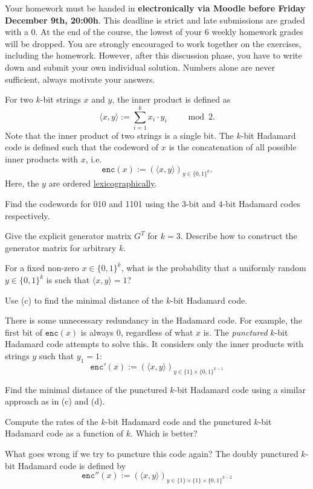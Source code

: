 \documentclass[a4paper,10pt,landscape,twocolumn]{scrartcl}
\newcommand\deadline{Friday December 9th, 20:00h}
\begin{document}
\homeworkproblems

{\sffamily\noindent
Your homework must be handed in \textbf{electronically via Moodle before \deadline}. This deadline is strict and late submissions are graded with a 0. At the end of the course, the lowest of your 6 weekly homework grades will be dropped. You are strongly encouraged to work together on the exercises, including the homework. However, after this discussion phase, you have to write down and submit your own individual solution. Numbers alone are never sufficient, always motivate your answers.
}

\newcommand{\ip}[2]{\langle #1, #2\rangle}
\begin{exercise}
For two $k$-bit strings $x$ and $y$, the inner product is defined as
\[
\ip{x}{y} := \sum_{i=1}^k x_i\cdot y_i \ \ \ \ \ \ \ \ \mod 2.
\]
Note that the inner product of two strings is a single bit. The $k$-bit Hadamard code is defined such that the codeword of $x$ is the concatenation of all possible inner products with $x$, i.e.
\[
\mathtt{enc}(x) := \left(\ip{x}{y}\right)_{y \in \{0,1\}^k}.
\]
Here, the $y$ are ordered \href{https://en.wikipedia.org/wiki/Lexicographical_order}{lexicographically}.
	\begin{subex}[(1pt)]
	Find the codewords for 010 and 1101 using the 3-bit and 4-bit Hadamard codes respectively.
	\end{subex}
	\begin{subex}[(2pt)]
	Give the explicit generator matrix $G^T$ for $k = 3$. Describe how to construct the generator matrix for arbitrary $k$.
	\end{subex}
	\begin{subex}[(2pt)]
	For a fixed non-zero $x \in \{0,1\}^k$, what is the probability that a uniformly random $y \in \{0,1\}^k$ is such that $\ip{x}{y} = 1$?
	\end{subex}
	\begin{subex}[(1pt)]
	Use (c) to find the minimal distance of the $k$-bit Hadamard code.
	\end{subex}
There is some unnecessary redundancy in the Hadamard code. For example, the first bit of $\mathtt{enc}(x)$ is always 0, regardless of what $x$ is. The \emph{punctured} $k$-bit Hadamard code attempts to solve this. It considers only the inner products with strings $y$ such that $y_1 = 1$:
\[
\mathtt{enc}'(x) := \left(\ip{x}{y}\right)_{y \in \{1\} \times \{0,1\}^{k-1}}
\]
	\begin{subex}[(3pt)]
	Find the minimal distance of the punctured $k$-bit Hadamard code using a similar approach as in (c) and (d).
	\end{subex}
	\begin{subex}[(2pt)]
	Compute the rates of the $k$-bit Hadamard code and the punctured $k$-bit Hadamard code as a function of $k$. Which is better?
	\end{subex}
	\begin{subex}[(1pt)]
	What goes wrong if we try to puncture this code again? The doubly punctured $k$-bit Hadamard code is defined by
	\[
	\mathtt{enc}''(x) := \left(\ip{x}{y}\right)_{y \in \{1\} \times \{1\} \times \{0,1\}^{k-2}}
	\]
	\end{subex}
\end{exercise}
\end{document}
